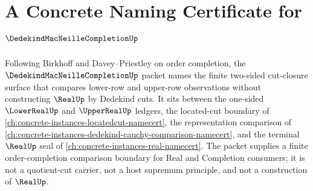 \chapter{A Concrete Naming Certificate for $\DedekindMacNeilleCompletionUp$}
\label{ch:concrete-instances-dedekind-macneille-completion-namecert}

Following Birkhoff and Davey--Priestley on order completion, the $\DedekindMacNeilleCompletionUp$ packet names the finite two-sided cut-closure surface that compares lower-row and upper-row observations without constructing $\RealUp$ by Dedekind cuts. It sits between the one-sided $\LowerRealUp$ and $\UpperRealUp$ ledgers, the located-cut boundary of \autoref{ch:concrete-instances-locatedcut-namecert}, the representation comparison of \autoref{ch:concrete-instances-dedekind-cauchy-comparison-namecert}, and the terminal $\RealUp$ seal of \autoref{ch:concrete-instances-real-namecert}. The packet supplies a finite order-completion comparison boundary for Real and Completion consumers; it is not a quotient-cut carrier, not a host supremum principle, and not a construction of $\RealUp$.

